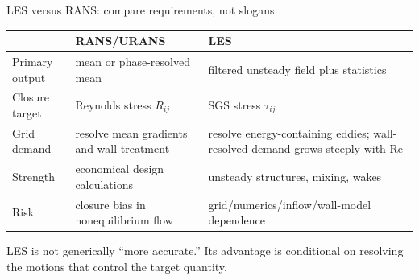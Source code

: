 \documentclass[aspectratio=169,11pt]{beamer}
\newcommand{\Rey}{\mathrm{Re}}
\begin{document}
\begin{frame}{LES versus RANS: compare requirements, not slogans}
\small
\begin{tabular}{@{}L{0.27\textwidth}L{0.32\textwidth}L{0.34\textwidth}@{}}
\toprule
& \textbf{RANS/URANS} & \textbf{LES}\\
\midrule
Primary output & mean or phase-resolved mean & filtered unsteady field plus statistics\\[3pt]
Closure target & Reynolds stress $R_{ij}$ & SGS stress $\tau_{ij}$\\[3pt]
Grid demand & resolve mean gradients and wall treatment & resolve energy-containing eddies; wall-resolved demand grows steeply with $\Rey$\\[3pt]
Strength & economical design calculations & unsteady structures, mixing, wakes\\[3pt]
Risk & closure bias in nonequilibrium flow & grid/numerics/inflow/wall-model dependence\\
\bottomrule
\end{tabular}

\vspace{0.55em}
\begin{punchbox}
LES is not generically ``more accurate.'' Its advantage is conditional on resolving the motions that control the target quantity.
\end{punchbox}
\end{frame}
\end{document}
